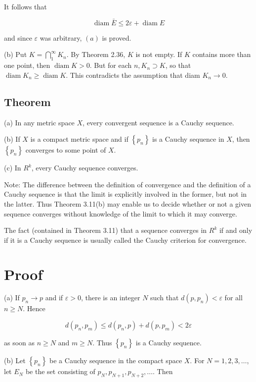 \documentclass[10pt]{article}
\begin{document}
It follows that

$$
\operatorname{diam} \bar{E} \leq 2 \varepsilon+\operatorname{diam} E
$$

and since $\varepsilon$ was arbitrary, $(a)$ is proved.

(b) Put $K=\bigcap_{1}^{\infty} K_{n}$. By Theorem 2.36, $K$ is not empty. If $K$ contains more than one point, then $\operatorname{diam} K>0$. But for each $n, K_{n} \supset K$, so that $\operatorname{diam} K_{n} \geq \operatorname{diam} K$. This contradicts the assumption that diam $K_{n} \rightarrow 0$.

\subsection{Theorem}
(a) In any metric space $X$, every convergent sequence is a Cauchy sequence.

(b) If $X$ is a compact metric space and if $\left\{p_{n}\right\}$ is a Cauchy sequence in $X$, then $\left\{p_{n}\right\}$ converges to some point of $X$.

(c) In $R^{k}$, every Cauchy sequence converges.

Note: The difference between the definition of convergence and the definition of a Cauchy sequence is that the limit is explicitly involved in the former, but not in the latter. Thus Theorem 3.11(b) may enable us
to decide whether or not a given sequence converges without knowledge of the limit to which it may converge.

The fact (contained in Theorem 3.11) that a sequence converges in $R^{k}$ if and only if it is a Cauchy sequence is usually called the Cauchy criterion for convergence.

\section{Proof}
(a) If $p_{n} \rightarrow p$ and if $\varepsilon>0$, there is an integer $N$ such that $d\left(p, p_{n}\right)<\varepsilon$ for all $n \geq N$. Hence

$$
d\left(p_{n}, p_{m}\right) \leq d\left(p_{n}, p\right)+d\left(p, p_{m}\right)<2 \varepsilon
$$

as soon as $n \geq N$ and $m \geq N$. Thus $\left\{p_{n}\right\}$ is a Cauchy sequence.

(b) Let $\left\{p_{n}\right\}$ be a Cauchy sequence in the compact space $X$. For $N=1,2,3, \ldots$, let $E_{N}$ be the set consisting of $p_{N}, p_{N+1}, p_{N+2}, \ldots$. Then
\end{document}
